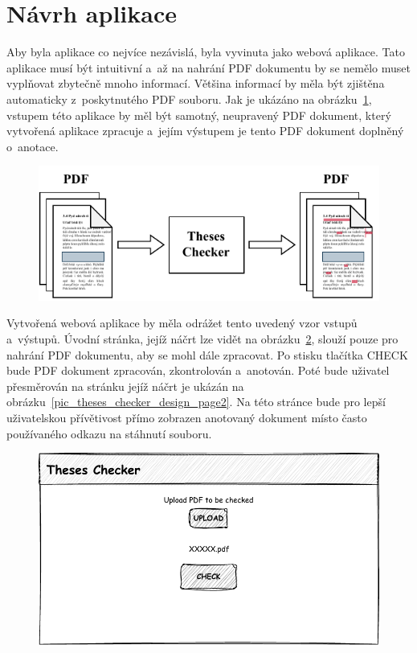 \section{Návrh aplikace}
Aby byla aplikace co nejvíce nezávislá, byla vyvinuta jako webová aplikace.
Tato aplikace musí být intuitivní a~až na nahrání PDF dokumentu by se nemělo
muset vyplňovat zbytečně mnoho informací. Většina informací by měla být
zjištěna automaticky z~poskytnutého PDF souboru. Jak je ukázáno na
obrázku~\ref{pic_theses_checker_dia}, vstupem této aplikace by měl být
samotný, neupravený PDF dokument, který vytvořená aplikace zpracuje
a~jejím výstupem je tento PDF dokument doplněný o~anotace.

\begin{figure}[H]
    \centering
    \includegraphics[width=\linewidth]{obrazky-figures/Theses_Checker_diagram.pdf}
    \caption{}
    \label{pic_theses_checker_dia}
\end{figure}

Vytvořená webová aplikace by měla odrážet tento uvedený vzor vstupů a~výstupů.
Úvodní stránka, jejíž náčrt lze vidět na
obrázku~\ref{pic_theses_checker_design_page1}, slouží pouze pro nahrání
PDF dokumentu, aby se mohl dále zpracovat. Po stisku tlačítka CHECK bude
PDF dokument zpracován, zkontrolován a~anotován. Poté bude uživatel přesměrován na
stránku jejíž náčrt je ukázán na obrázku~\ref{pic_theses_checker_design_page2}.
Na této stránce bude pro lepší uživatelskou přívětivost přímo zobrazen
anotovaný dokument místo často používaného odkazu na stáhnutí souboru.

\begin{figure}[H]
    \centering
    \includegraphics[width=0.8\linewidth]{obrazky-figures/Theses_Checker_design-page1.pdf}
    \caption{}
    \label{pic_theses_checker_design_page1}
\end{figure}

